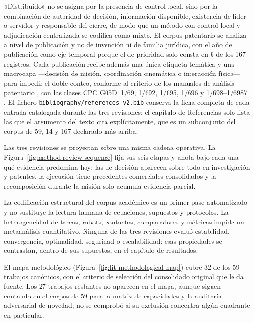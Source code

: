 «Distribuido» no se asigna por la presencia de control local, sino por la
combinación de autoridad de decisión, información disponible, existencia de
líder o servidor y responsable del cierre, de modo que un método con control
local y adjudicación centralizada se codifica como mixto. El corpus
patentario se analiza a nivel de publicación y no de invención ni de familia
jurídica, con el año de publicación como eje temporal porque el de prioridad
solo consta en 6 de los 167 registros. Cada publicación recibe además una
única etiqueta temática y una macrocapa ---decisión de misión, coordinación
cinemática o interacción física--- para impedir el doble conteo, conforme al
criterio de los manuales de análisis patentario
\parencite{wipoPatentLandscape,oecdPatentManual2009}, con las clases CPC
G05D~1/69, 1/692, 1/695, 1/696 y 1/698--1/6987 \parencite{usptoCpcG05D}.
El fichero \texttt{bibliography/references-v2.bib} conserva la ficha completa
de cada entrada catalogada durante las tres revisiones; el capítulo de
Referencias solo lista las que el argumento del texto cita explícitamente,
que es un subconjunto del corpus de 59, 14 y 167 declarado más arriba.

Las tres revisiones se proyectan sobre una misma cadena operativa. La
Figura~\ref{fig:method-review-sequence} fija sus seis etapas y anota bajo cada
una qué evidencia predomina hoy: las de decisión aparecen sobre todo en
investigación y patentes, la ejecución tiene precedentes comerciales
consolidados y la recomposición durante la misión solo acumula evidencia
parcial.



La codificación estructural del corpus académico es un primer pase
automatizado y no sustituye la lectura humana de ecuaciones, supuestos y
protocolos. La heterogeneidad de tareas, robots, contactos, comparadores y
métricas impide un metaanálisis cuantitativo. Ninguna de las tres revisiones
evaluó estabilidad, convergencia, optimalidad, seguridad o escalabilidad: esas
propiedades se contrastan, dentro de sus supuestos, en el capítulo de
resultados.

El mapa metodológico (Figura~\ref{fig:lit-methodological-map}) cubre 32 de
los 59 trabajos canónicos, con el criterio de selección del consolidado
original que le da fuente. Los 27 trabajos restantes no aparecen en el mapa,
aunque siguen contando en el corpus de 59 para la matriz de capacidades y la
auditoría adversarial de novedad; no se comprobó si su exclusión concentra
algún cuadrante en particular.

